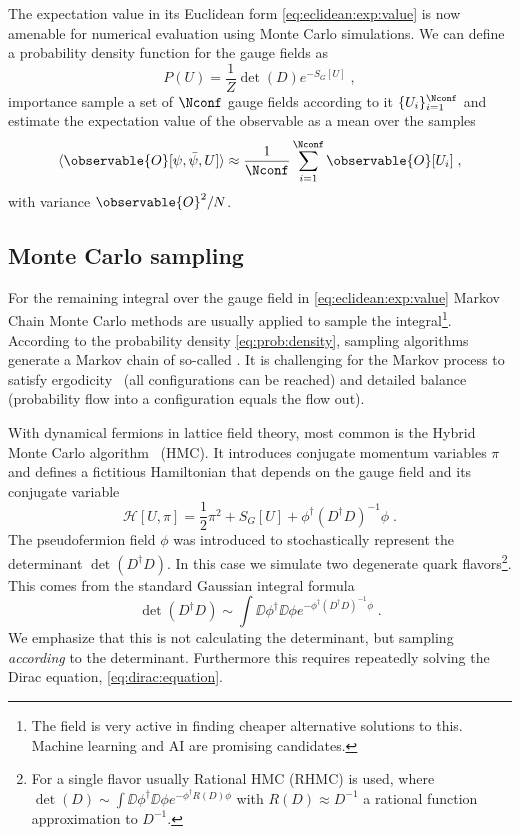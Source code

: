 The expectation value in its Euclidean form \cref{eq:eclidean:exp:value} is now amenable for numerical evaluation using Monte Carlo simulations.
We can define a probability density function for the gauge fields as
\begin{equation} \label{eq:prob:density}
P(U) = \frac{1}{Z} \det(D) e^{- S_G[U]} \;,
\end{equation}
importance sample a set of $\Nconf$ gauge fields according to it $\{U_i\}_{i=1}^{\Nconf}$ and estimate the expectation value of the observable as a mean over the samples
\begin{equation}
\langle \observable{O}[\psi, \bar{\psi}, U] \rangle \approx \frac{1}{\Nconf} \sum_{i=1}^{\Nconf} \observable{O}[U_i] \;,
\end{equation}
with variance $\observable{O}^{2} / N$.


\subsection{Monte Carlo sampling}


For the remaining integral over the gauge field in \cref{eq:eclidean:exp:value} Markov Chain Monte Carlo methods are usually applied to sample the integral\footnote{The field is very active in finding cheaper alternative solutions to this. Machine learning and AI are promising candidates.}.
According to the probability density \cref{eq:prob:density}, sampling algorithms generate a Markov chain of so-called .
It is challenging for the Markov process to satisfy ergodicity~\cite{10.1063/5.0004106,PhysRevLett.60.1243} (all configurations can be reached) and detailed balance (probability flow into a configuration equals the flow out).

With dynamical fermions in lattice field theory, most common is the Hybrid Monte Carlo algorithm~\cite{DUANE1987216} (HMC).
It introduces conjugate momentum variables $\pi$ and defines a fictitious Hamiltonian that depends on the gauge field and its conjugate variable
\begin{equation}
\mathcal{H}[U, \pi] = \frac{1}{2} \pi^{2} + S_{G}[U] + \phi^{\dagger} (D^{\dagger} D)^{-1} \phi \;.
\end{equation}
The pseudofermion field $\phi$ was introduced to stochastically represent the determinant $\det(D^{\dagger} D)$.
In this case we simulate two degenerate quark flavors\footnote{For a single flavor usually Rational HMC (RHMC) is used, where $\det(D) \sim \int \DD \phi^{\dagger} \DD \phi e^{-\phi^{\dagger} R(D) \phi}$ with $R(D) \approx D^{-1}$ a rational function approximation to $D^{-1}$.}.
This comes from the standard Gaussian integral formula
\begin{equation}
\det(D^{\dagger} D) \sim \int \DD \phi^{\dagger} \DD \phi e^{- \phi^{\dagger} ( D^{\dagger} D )^{-1} \phi} \;.
\end{equation}
We emphasize that this is not calculating the determinant, but sampling \emph{according} to the determinant.
Furthermore this requires repeatedly solving the Dirac equation, \cref{eq:dirac:equation}.

